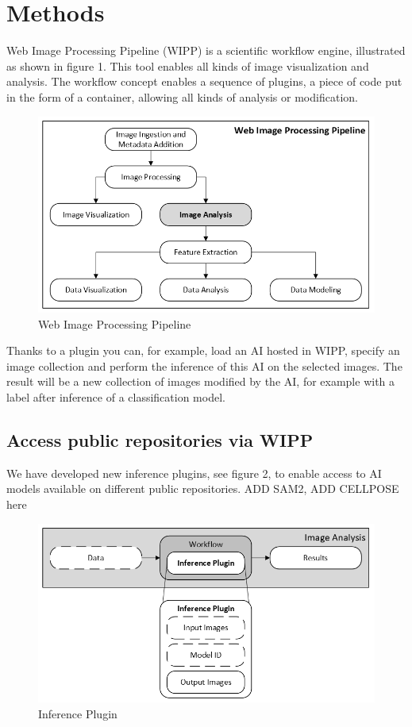 \section{Methods}
\label{sec:methods}

Web Image Processing Pipeline (WIPP) is a scientific workflow engine,
illustrated as shown in figure 1. This tool enables all kinds of image
visualization and analysis. The workflow concept enables a sequence of plugins,
a piece of code put in the form of a container, allowing all kinds of analysis
or modification.

\begin{figure}[H]
  \centering
  \includegraphics[width=0.8\linewidth]{png/1_wipp.png}
  \caption{Web Image Processing Pipeline}
  \label{fig:1wipp}
\end{figure}

Thanks to a plugin you can, for example, load an AI hosted in WIPP, specify an
image collection and perform the inference of this AI on the selected images.
The result will be a new collection of images modified by the AI, for example
with a label after inference of a classification model.

\subsection{Access public repositories via WIPP}

We have developed new inference plugins, see figure 2, to enable access to AI
models available on different public repositories.
\TODO ADD SAM2, ADD CELLPOSE here

\begin{figure}[H]
  \centering
  \includegraphics[width=0.8\linewidth]{png/2_inference_plugin.png}
  \caption{Inference Plugin}
  \label{fig:2inference}
\end{figure}

